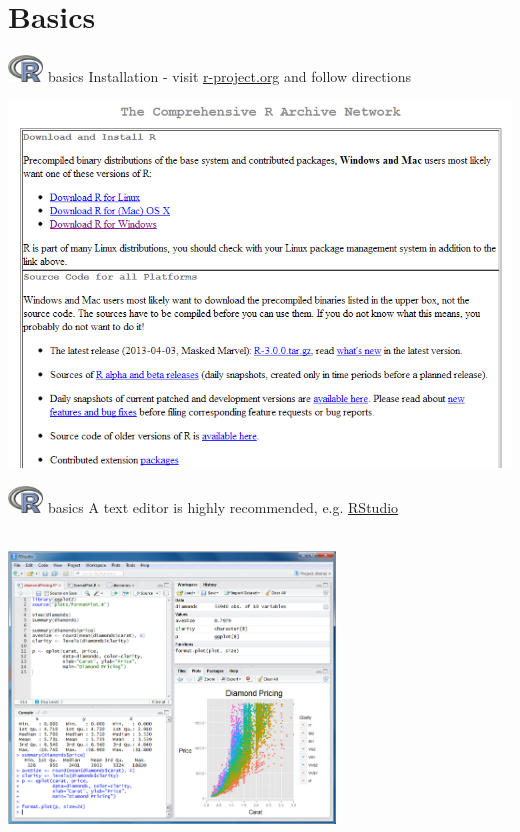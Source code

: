 \documentclass[xcolor=svgnames]{beamer}
\begin{document}
\section{Basics}
\begin{frame}[t]{\includegraphics[width=0.07\textwidth]{Rlogo.jpg} \hspace{0.01in} basics}
Installation - visit \href{http://cran.us.r-project.org/}{r-project.org} and follow directions
\centerline{\includegraphics{download.png}}
\end{frame}

\begin{frame}[t]{\includegraphics[width=0.07\textwidth]{Rlogo.jpg} \hspace{0.01in} basics}
A text editor is highly recommended, e.g. \href{http://www.rstudio.com/}{RStudio}\\~\\
\centerline{\includegraphics[width=0.65\textwidth]{Rstudio.png}}
\end{frame}
\end{document}
